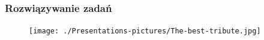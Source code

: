 \documentclass[10pt,t]{beamer}
\begin{document}
\begin{frame}
  \frametitle{Rozwiązywanie zadań}

  \vspace{-0.5em}


  \begin{figure}

    \label{fig:The-best-tribute}

    \centering


    \texttt{[image: ./Presentations-pictures/The-best-tribute.jpg]}

  \end{figure}

\end{frame}
\end{document}
